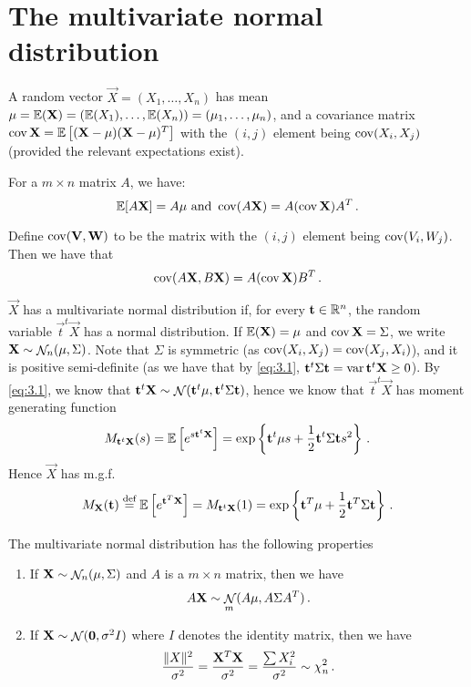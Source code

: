 \section{The multivariate normal distribution}
A random vector $\vec{X} = (X_1, \dotsc, X_n)$ has mean $\mathbf{\mu} = \mathbb{E} (\mathbf{X}) = (\mathbb{E}(X_1), \dotsc, \mathbb{E}(X_n)) = (\mu_1, \dotsc, \mu_n)$, and a covariance matrix $\operatorname{cov} \mathbf{X} = \mathbb{E} \left[ (\mathbf{X} - \mathbf{\mu})(\mathbf{X} - \mathbf{\mu})^T \right]$ with the $(i, j)$ element being $\operatorname{cov} (X_i, X_j)$ (provided the relevant expectations exist).

For a $m \times n$ matrix $A$, we have:
\begin{equation}
  \label{eq:3.1}
\mathbb{E} [A\mathbf{X}] = A \mathbf{\mu} \text{ and } \operatorname{cov} (A\mathbf{X}) = A (\operatorname{cov} \mathbf{X}) A^T \, {.}
\end{equation}

Define $\operatorname{cov}( \mathbf{V}, \mathbf{W} )$ to be the matrix with the $(i, j)$ element being $\operatorname{cov} (V_i, W_j)$. Then we have that
\[
\operatorname{cov} (A\mathbf{X}, B\mathbf{X}) = A (\operatorname{cov} \mathbf{X}) B^T \, {.}
\]

$\vec{X}$ has a multivariate normal distribution if, for every $\mathbf{t} \in \mathbb{R}^n$, the random variable $\vec{t}^t\vec{X}$ has a normal distribution.
If $\mathbb{E}(\mathbf{X}) = \mathbf{\mu}$ and $\operatorname{cov} \mathbf{X} = \Sigma$, we write $\mathbf{X} \sim \mathop{\mathcal{N}}_n (\mathbf{\mu}, \Sigma)$.
Note that $\Sigma$ is symmetric (as $\operatorname{cov} (X_i, X_j) = \operatorname{cov}(X_j, X_i)$), and it is positive semi-definite (as we have that by \eqref{eq:3.1}, $\mathbf{t}^t\Sigma\mathbf{t} = \operatorname{var} \mathbf{t}^t \mathbf{X} \geq 0$).
By \eqref{eq:3.1}, we know that $\mathbf{t}^t\mathbf{X} \sim \mathop{\mathcal{N}}(\mathbf{t}^t\mathbf{\mu}, \mathbf{t}^t\Sigma\mathbf{t})$, hence we know that $\vec{t}^t\vec{X}$ has moment generating function
\[
M_{\mathbf{t}^t\mathbf{X}}(s) = \mathbb{E}\left[ e^{s \mathbf{t}^t\mathbf{X}} \right] = \exp \left\{ \mathbf{t}^t\mathbf{\mu}s + \frac{1}{2} \mathbf{t}^t\Sigma\mathbf{t} s^2 \right\}\, {.}
\]
Hence $\vec{X}$ has m.g.f.
\begin{equation}
  \label{eq:3.2}
M_{\mathbf{X}}(\mathbf{t}) \stackrel{\text{def}}{=} \mathbb{E} \left[e^{\mathbf{t}^T\mathbf{X}}\right] = M_{\mathbf{t}^t\mathbf{X}}(1) = \exp \left\{ \mathbf{t}^T\mathbf{\mu} + \frac{1}{2}\mathbf{t}^T\Sigma\mathbf{t} \right\} \, {.}
\end{equation}

\begin{proposition}
The multivariate normal distribution has the following properties
\begin{enumerate}
\item If $\mathbf{X} \sim \mathop{\mathcal{N}}_n(\mathbf{\mu}, \Sigma)$ and $A$ is a $m \times n$ matrix, then we have
\[
A\mathbf{X} \sim \mathop{\mathcal{N}}_m(A\mathbf{\mu}, A \Sigma A^T) \, {.}
\]
\item If $\mathbf{X} \sim \mathop{\mathcal{N}}(\mathbf{0}, \sigma^2 I)$ where $I$ denotes the identity matrix, then we have
\[
\frac{\lVert X\rVert^2}{\sigma^2} = \frac{\mathbf{X}^T\mathbf{X}}{\sigma^2} = \frac{\sum X_i^2}{\sigma^2} \sim \chi^2_n \, {.}
\]
\end{enumerate}
\end{proposition}

